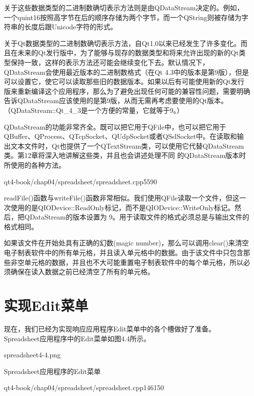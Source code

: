 \documentclass[11pt,oneside]{book}
\begin{document}
\begin{common-format}
关于这些数据类型的二进制数确切表示方法则是由QDataStream决定的。例如，一个quint16按照高字节在后的顺序存储为两个字节，而一个QString则被存储为字符串的长度后跟Unicode字符的形式。

关于Qt数据类型的二进制数确切表示方法，自Qt1.0以来已经发生了许多变化。而且在未来的Qt发行版中，为了能够与现存的数据类型和将来允许出现的新的Qt类型保持一致，这样的表示方法还可能会继续变化下去。默认情况下，QDataStream会使用最近版本的二进制数格式（在Qt 4.3中的版本是第9版），但是可以设置它，使它可以读取那些旧的数据版本。如果以后有可能使用新的Qt发行版来重新编译这个应用程序，那么为了避免出现任何可能的兼容性问题，需要明确告诉QDataStream应该使用的是第9版，从而无需再考虑要使用的Qt版本。（QDataStream::Qt\_{}4\_{}3是一个方便的常量，它就等于9。）

QDataStream的功能非常齐全。既可以把它用于QFile中，也可以把它用于QBuffer、QProcess、QTcpSocket、QUdpSocket或者QSslSocket中。在读取和输出文本文件时，Qt也提供了一个QTextStream类，可以使用它代替QDataStream类。第12章将深入地讲解这些类，并且也会讲述处理不同
的QDataStream版本时所使用的各种方法。

\begin{cppline}{qt4-book/chap04/spreadsheet/spreadsheet.cpp}{55}{90}
\end{cppline}

readFile()函数与writeFile()函数非常相似。我们使用QFile读取一个文件，但这一次使用的是QIODevice::ReadOnly标记，而不是QIODevice::WriteOnly标记。然后，把QDataStream的版本设置为
9。用于读取文件的格式必须总是与输出文件的格式相同。

如果该文件在开始处具有正确的幻数(magic number)，那么可以调用clear()来清空电子制表软件中的所有单元格，并且读入单元格中的数据。由于该文件中只包含那些非空单元格的数据，并且也不大可能重置电子制表软件中的每个单元格，所以必须确保在读入数据之前已经清空了所有的单元格。


\section{实现Edit菜单}
现在，我们已经为实现响应应用程序Edit菜单中的各个槽做好了准备。Spreadsheet应用程序中的Edit菜单如图4.4所示。    
\begin{fig}[0.8]{spreadsheet4-4.png}
\caption{Spreadsheet应用程序的Edit菜单}
\label{fig:spreadsheet4-4.png}
\end{fig}

\begin{cppline}{qt4-book/chap04/spreadsheet/spreadsheet.cpp}{146}{150}
\end{cppline}


\end{common-format}
\end{document}
